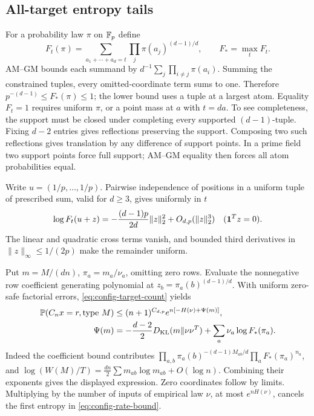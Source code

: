 \subsection{All-target entropy tails}
For a probability law $\pi$ on $\mathbb F_p$ define
\[
 F_t(\pi)=\sum_{a_1+\cdots+a_d=t}
               \prod_j\pi(a_j)^{(d-1)/d},\qquad F_* =\max_tF_t.
\]
AM--GM bounds each summand by
$d^{-1}\sum_j\prod_{i\ne j}\pi(a_i)$. Summing the constrained
tuples, every omitted-coordinate term sums to one. Therefore
$p^{-(d-1)}\le F_*(\pi)\le1$; the lower bound uses a tuple at a
largest atom. Equality $F_t=1$ requires uniform $\pi$, or a point
mass at $a$ with $t=da$. To see completeness, the support must be
closed under completing every supported $(d-1)$-tuple. Fixing
$d-2$ entries gives reflections preserving the support. Composing
two such reflections gives translation by any difference of support
points. In a prime field two support points force full support;
AM--GM equality then forces all atom probabilities equal.

Write $u=(1/p,\ldots,1/p)$. Pairwise independence of positions in a
uniform tuple of prescribed sum, valid for $d\ge3$, gives uniformly
in $t$
\begin{equation}\label{eq:config-row-Taylor}
 \log F_t(u+z)=-\frac{(d-1)p}{2d}\|z\|_2^2+O_{d,p}(\|z\|_2^3)
 \quad(\mathbf 1^Tz=0).
\end{equation}
The linear and quadratic cross terms vanish, and bounded third
derivatives in $\|z\|_\infty\le1/(2p)$ make the remainder uniform.

Put $m=M/(dn)$, $\pi_a=m_a/\nu_a$, omitting zero rows. Evaluate
the nonnegative row coefficient generating polynomial at
$z_b=\pi_a(b)^{(d-1)/d}$. With uniform zero-safe factorial errors,
\eqref{eq:config-target-count} yields
\begin{align}
 \mathbb P(C_nx=r,\text{type }M)
 &\le(n+1)^{C_{d,p}}
             e^{n[-H(\nu)+\Psi(m)]},\label{eq:config-rate-bound}\\
 \Psi(m)&=-\frac{d-2}{2}D_{\mathrm{KL}}(m\Vert\nu\nu^T)
             +\sum_a\nu_a\log F_*(\pi_a).\label{eq:config-rate}
\end{align}
Indeed the coefficient bound contributes
$\prod_{a,b}\pi_a(b)^{-(d-1)M_{ab}/d}
\prod_aF_*(\pi_a)^{n_a}$, and
$\log(W(M)/T)=\tfrac{dn}{2}\sum m_{ab}\log m_{ab}+O(\log n)$.
Combining their exponents gives the displayed expression.
Zero coordinates follow by limits. Multiplying by the number of
inputs of empirical law $\nu$, at most $e^{nH(\nu)}$, cancels
the first entropy in \eqref{eq:config-rate-bound}.

